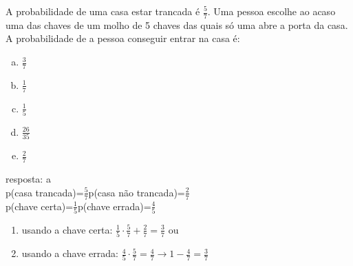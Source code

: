 \begin{ex}
 A probabilidade de uma casa estar trancada é $\frac{5}{7}$. Uma pessoa escolhe ao acaso uma das chaves de um molho de 5 chaves das quais só uma abre a porta da casa. A probabilidade de a pessoa conseguir entrar na casa é:
    \begin{enumerate}[(a)]
    \item $\frac{3}{7}$
    \item $\frac{1}{7}$
    \item $\frac{1}{5}$
    \item $\frac{26}{35}$
    \item $\frac{2}{7}$
    \end{enumerate}
      \begin{sol}
      resposta: a\\
        p(casa trancada)=$\frac{5}{7}$\hspace{1cm}p(casa não trancada)=$\frac{2}{7}$\\
        p(chave certa)=$\frac{1}{5}$\hspace{1.45cm}p(chave errada)=$\frac{4}{5}$
          \begin{enumerate} [--]
              \item usando a chave certa: $\frac{1}{5}\cdot\frac{5}{7}+\frac{2}{7}=\frac{3}{7}$\hspace{0.7cm}      ou
              \item usando a chave errada:  $\frac{4}{5}\cdot\frac{5}{7}=\frac{4}{7}\longrightarrow 1-\frac{4}{7}=\frac{3}{7}$
          \end{enumerate}
      \end{sol}
\end{ex}